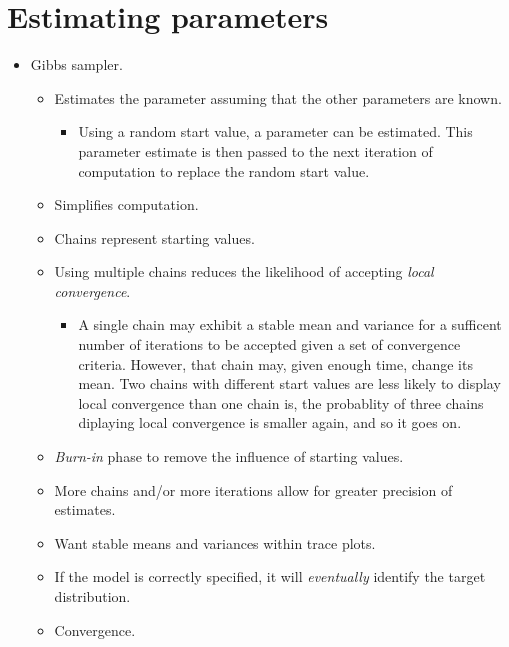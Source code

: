 \documentclass[
  a4paper,
  DIV=11,
  numbers=noendperiod]{scrreprt}
\providecommand{\tightlist}{%
  \setlength{\itemsep}{0pt}\setlength{\parskip}{0pt}}\usepackage{longtable,booktabs,array}
\begin{document}
\section{Estimating parameters}\label{estimating-parameters}

\begin{itemize}
\tightlist
\item
  Gibbs sampler.

  \begin{itemize}
  \tightlist
  \item
    Estimates the parameter assuming that the other parameters are
    known.

    \begin{itemize}
    \tightlist
    \item
      Using a random start value, a parameter can be estimated. This
      parameter estimate is then passed to the next iteration of
      computation to replace the random start value.
    \end{itemize}
  \item
    Simplifies computation.
  \item
    Chains represent starting values.
  \item
    Using multiple chains reduces the likelihood of accepting
    \emph{local convergence}.

    \begin{itemize}
    \tightlist
    \item
      A single chain may exhibit a stable mean and variance for a
      sufficent number of iterations to be accepted given a set of
      convergence criteria. However, that chain may, given enough time,
      change its mean. Two chains with different start values are less
      likely to display local convergence than one chain is, the
      probablity of three chains diplaying local convergence is smaller
      again, and so it goes on.
    \end{itemize}
  \item
    \emph{Burn-in} phase to remove the influence of starting values.
  \item
    More chains and/or more iterations allow for greater precision of
    estimates.
  \item
    Want stable means and variances within trace plots.
  \item
    If the model is correctly specified, it will \emph{eventually}
    identify the target distribution.
  \item
    Convergence.


\end{itemize}
\end{itemize}
\end{document}

